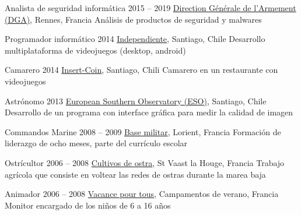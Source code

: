 \begin{joblist}[13.2][7.8][3.5]


\item[Analista de seguridad informática]{2015 -- 2019}
	{
  \href{http://www.defense.gouv.fr/dga/}{Direction Générale de l'Armement (DGA)}, Rennes, Francia
	}
	{Análisis de productos de seguridad y malwares}


\item[Programador informático]{2014}
	{
	\href{https://play.google.com/store/apps/developer?id=tinmarino&hl=en}{Independiente}, Santiago, Chile
	}
	{Desarrollo multiplataforma de videojuegos (desktop, android)}


\item[Camarero]{2014}
	{
	\href{http://www.insertcoin.cl/}{Insert-Coin}, Santiago, Chili
	}
	{Camarero en un restaurante con videojuegos}


\item[Astrónomo]{2013}
	{
	\href{http://www.eso.org/public/}{European Southern Observatory (ESO)}, Santiago, Chile
	}
	{Desarrollo de un programa con interface gráfica para medir la calidad de imagen}

	
\item[Commandos Marine]{2008 -- 2009}
	{
	\href{http://www.defense.gouv.fr/marine/organisation/forces/fusiliers-marins-et-commandos/force-maritime-des-fusiliers-marins-et-commandos}{Base militar}, Lorient, Francia
	}
	{Formación de liderazgo de ocho meses, parte del currículo escolar}


\item[Ostrícultor]{2006 -- 2008}
	{
	\href{http://huitresdesaintvaast.fr/}{Cultivos de ostra}, St Vaast la Houge, Francia
	}
	{Trabajo agrícola que consiste en voltear las redes de ostras durante la marea baja}


\item[Animador]{2006 -- 2008}
	{
	\href{http://www.vacances-pour-tous.org/}{Vacance pour tous}, Campamentos de verano, Francia
	}
	{Monitor encargado de los niños de 6 a 16 años}
	
	
\end{joblist}


